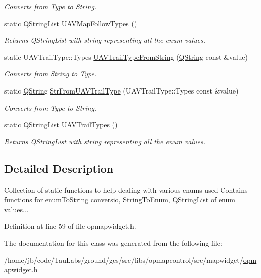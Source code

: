 \begin{DoxyCompactItemize}
\begin{DoxyCompactList}\small\item\em \-Converts from \-Type to \-String. \end{DoxyCompactList}\item 
static \-Q\-String\-List \hyperlink{group___o_p_map_widget_gacb5ad4b31c187f1d10098f83053246ff}{\-U\-A\-V\-Map\-Follow\-Types} ()
\begin{DoxyCompactList}\small\item\em \-Returns \-Q\-String\-List with string representing all the enum values. \end{DoxyCompactList}\item 
static \-U\-A\-V\-Trail\-Type\-::\-Types \hyperlink{group___o_p_map_widget_ga09a4876b008985c01beda818f860830b}{\-U\-A\-V\-Trail\-Type\-From\-String} (\hyperlink{group___u_a_v_objects_plugin_gab9d252f49c333c94a72f97ce3105a32d}{\-Q\-String} const \&value)
\begin{DoxyCompactList}\small\item\em \-Converts from \-String to \-Type. \end{DoxyCompactList}\item 
static \hyperlink{group___u_a_v_objects_plugin_gab9d252f49c333c94a72f97ce3105a32d}{\-Q\-String} \hyperlink{group___o_p_map_widget_gab2895e09cf7115779c738cc43d815123}{\-Str\-From\-U\-A\-V\-Trail\-Type} (\-U\-A\-V\-Trail\-Type\-::\-Types const \&value)
\begin{DoxyCompactList}\small\item\em \-Converts from \-Type to \-String. \end{DoxyCompactList}\item 
static \-Q\-String\-List \hyperlink{group___o_p_map_widget_gad33e776681a2d3d4d44bef508d231336}{\-U\-A\-V\-Trail\-Types} ()
\begin{DoxyCompactList}\small\item\em \-Returns \-Q\-String\-List with string representing all the enum values. \end{DoxyCompactList}\end{DoxyCompactItemize}


\subsection{\-Detailed \-Description}
\-Collection of static functions to help dealing with various enums used \-Contains functions for enum\-To\-String conversio, \-String\-To\-Enum, \-Q\-String\-List of enum values... 

\-Definition at line 59 of file opmapwidget.\-h.



\-The documentation for this class was generated from the following file\-:\begin{DoxyCompactItemize}
\item 
/home/jb/code/\-Tau\-Labs/ground/gcs/src/libs/opmapcontrol/src/mapwidget/\hyperlink{opmapwidget_8h}{opmapwidget.\-h}\end{DoxyCompactItemize}
